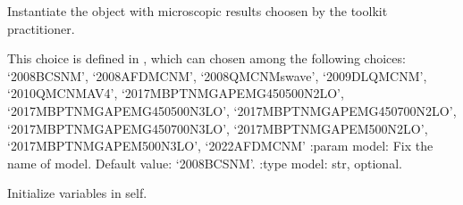 \documentclass[letterpaper,10pt,english]{sphinxmanual}
\begin{document}

\begin{fulllineitems}
\label{\detokenize{source/api/setup_matter_micro_gap:nucleardatapy.matter.setup_micro_gap.setupMicroGap}}
\pysigstartsignatures
{}
\pysigstopsignatures
\sphinxAtStartPar
Instantiate the object with microscopic results choosen     by the toolkit practitioner.

\sphinxAtStartPar
This choice is defined in , which can chosen among     the following choices:     ‘2008\sphinxhyphen{}BCS\sphinxhyphen{}NM’, ‘2008\sphinxhyphen{}AFDMC\sphinxhyphen{}NM’,     ‘2008\sphinxhyphen{}QMC\sphinxhyphen{}NM\sphinxhyphen{}swave’, ‘2009\sphinxhyphen{}DLQMC\sphinxhyphen{}NM’, ‘2010\sphinxhyphen{}QMC\sphinxhyphen{}NM\sphinxhyphen{}AV4’, ‘2017\sphinxhyphen{}MBPT\sphinxhyphen{}NM\sphinxhyphen{}GAP\sphinxhyphen{}EMG\sphinxhyphen{}450\sphinxhyphen{}500\sphinxhyphen{}N2LO’,     ‘2017\sphinxhyphen{}MBPT\sphinxhyphen{}NM\sphinxhyphen{}GAP\sphinxhyphen{}EMG\sphinxhyphen{}450\sphinxhyphen{}500\sphinxhyphen{}N3LO’, ‘2017\sphinxhyphen{}MBPT\sphinxhyphen{}NM\sphinxhyphen{}GAP\sphinxhyphen{}EMG\sphinxhyphen{}450\sphinxhyphen{}700\sphinxhyphen{}N2LO’,     ‘2017\sphinxhyphen{}MBPT\sphinxhyphen{}NM\sphinxhyphen{}GAP\sphinxhyphen{}EMG\sphinxhyphen{}450\sphinxhyphen{}700\sphinxhyphen{}N3LO’, ‘2017\sphinxhyphen{}MBPT\sphinxhyphen{}NM\sphinxhyphen{}GAP\sphinxhyphen{}EM\sphinxhyphen{}500\sphinxhyphen{}N2LO’, ‘2017\sphinxhyphen{}MBPT\sphinxhyphen{}NM\sphinxhyphen{}GAP\sphinxhyphen{}EM\sphinxhyphen{}500\sphinxhyphen{}N3LO’,     ‘2022\sphinxhyphen{}AFDMC\sphinxhyphen{}NM’
:param model: Fix the name of model. Default value: ‘2008\sphinxhyphen{}BCS\sphinxhyphen{}NM’.
:type model: str, optional.

\sphinxAtStartPar
{}

\begin{fulllineitems}
\label{\detokenize{source/api/setup_matter_micro_gap:nucleardatapy.matter.setup_micro_gap.setupMicroGap.init_self}}
\pysigstartsignatures
{}
\pysigstopsignatures
\sphinxAtStartPar
Initialize variables in self.


\end{fulllineitems}
\end{fulllineitems}
\end{document}
